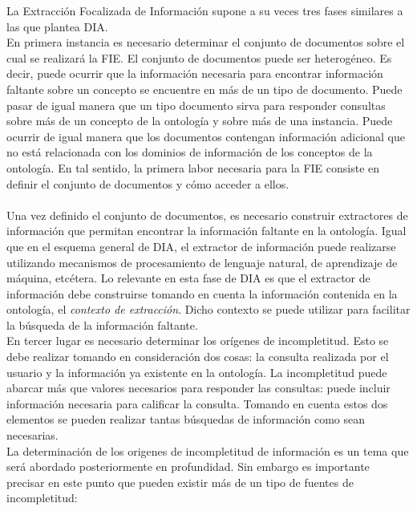 La Extracción Focalizada de Información supone a su veces tres fases similares a las que plantea DIA. \\

En primera instancia es necesario determinar el conjunto de documentos sobre el cual se realizará la FIE. El conjunto de documentos puede ser heterogéneo. Es decir, puede ocurrir que la información necesaria para encontrar información faltante sobre un concepto se encuentre en más de un tipo de documento. Puede pasar de igual manera que un tipo documento sirva para responder consultas sobre más de un concepto de la ontología y sobre más de una instancia. Puede ocurrir de igual manera que los documentos contengan información adicional que no está relacionada con los dominios de información de los conceptos de la ontología. En tal sentido, la primera labor necesaria para la FIE consiste en definir el conjunto de documentos y cómo acceder a ellos. \\

\\

Una vez definido el conjunto de documentos, es necesario construir extractores de información que permitan encontrar la información faltante en la ontología. Igual que en el esquema general de DIA, el extractor de información puede realizarse utilizando mecanismos de procesamiento de lenguaje natural, de aprendizaje de máquina, etcétera. Lo relevante en esta fase de DIA es que el extractor de información debe construirse tomando en cuenta la información contenida en la ontología, el \emph{contexto de extracción}. Dicho contexto se puede utilizar para facilitar la búsqueda de la información faltante.\\

En tercer lugar es necesario determinar los orígenes de incompletitud. Esto se debe realizar tomando en consideración dos cosas: la consulta realizada por el usuario y la información ya existente en la ontología. La incompletitud puede abarcar más que valores necesarios para responder las consultas: puede incluir información necesaria para calificar la consulta. Tomando en cuenta estos dos elementos se pueden realizar tantas búsquedas de información como sean necesarias. \\

La determinación de los origenes de incompletitud de información es un tema que será abordado posteriormente en profundidad. Sin embargo es importante precisar en este punto que pueden existir más de un tipo de fuentes de incompletitud:\\

